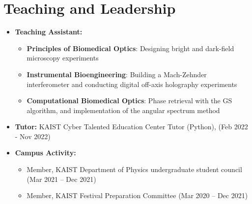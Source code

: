 \documentclass[a4paper,12pt]{article}
\newcommand{\resumeItem}[2]{
  \item{
    \textbf{#1}{\hspace{0.5mm}#2 \vspace{-0.5mm}}
  }
}
\newcommand{\resumeSubItem}[2]{\resumeItem{#1}{#2}\vspace{-4pt}}
\newcommand{\resumeSubHeadingListStart}{\begin{itemize}[leftmargin=*,labelsep=1mm]}
\newcommand{\resumeSubHeadingListEnd}{\end{itemize}\vspace{2mm}}
\begin{document}
\section{\textbf{Teaching and Leadership}}
\vspace{-0.4mm}
\resumeSubHeadingListStart
\resumeSubItem{Teaching Assistant: }
{
\begin{itemize}[leftmargin=*, itemsep=0pt, topsep=0pt]
  \item \textbf{Principles of Biomedical Optics}: Designing bright and dark-field microscopy experiments
  \item \textbf{Instrumental Bioengineering}: Building a Mach-Zehnder interferometer and conducting digital off-axis holography experiments
  \item \textbf{Computational Biomedical Optics}: Phase retrieval with the GS algorithm, and implementation of the angular spectrum method
\end{itemize}
}

\resumeSubItem{Tutor: }
{KAIST Cyber Talented Education Center Tutor (Python), (Feb 2022 - Nov 2022)}

\resumeSubItem{Campus Activity: }
{
\begin{itemize}[leftmargin=*, itemsep=0pt, topsep=0pt]
  \item Member, KAIST Department of Physics undergraduate student council (Mar 2021 -- Dec 2021)
  \item Member, KAIST Festival Preparation Committee (Mar 2020 -- Dec 2021)
\end{itemize}
}
\resumeSubHeadingListEnd

\vspace{-6mm}
\end{document}

